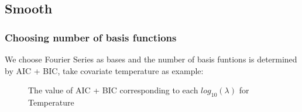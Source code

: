 \documentclass[
	9pt, %
]{beamer}
\begin{document}
\subsection{Smooth}
\begin{frame}
	\frametitle{Choosing number of basis functions}	
	We choose Fourier Series as bases and the number of basis funtions is determined by AIC + BIC, take covariate temperature as example: 
	\begin{figure}[H]
	\centering  %
	\caption{The value of AIC + BIC corresponding to each $log_{10}(\lambda)$ for Temperature}
	\end{figure}
\end{frame}

\end{document}
